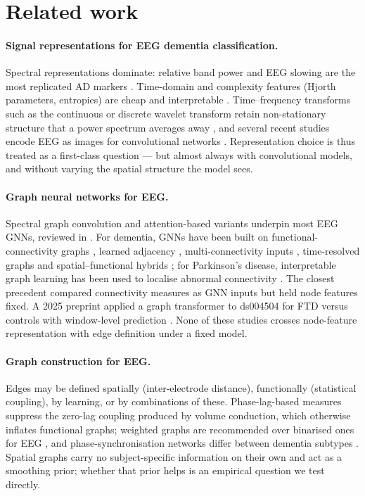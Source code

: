 \section{Related work}\label{sec:related}

\paragraph{Signal representations for EEG dementia classification.}
Spectral representations dominate: relative band power and EEG slowing are the most replicated AD
markers \cite{R3,F2,R15}. Time-domain and complexity features (Hjorth parameters, entropies) are
cheap and interpretable \cite{R15,R14}. Time--frequency transforms such as the continuous or
discrete wavelet transform retain non-stationary structure that a power spectrum averages away
\cite{R2,R16}, and several recent studies encode EEG as images for convolutional networks
\cite{R2,R10}. Representation choice is thus treated as a first-class question --- but almost
always with convolutional models, and without varying the spatial structure the model sees.

\paragraph{Graph neural networks for EEG.}
Spectral graph convolution \cite{F13} and attention-based variants \cite{gat} underpin most EEG
GNNs, reviewed in \cite{F5}. For dementia, GNNs have been built on functional-connectivity graphs
\cite{F3}, learned adjacency \cite{F4}, multi-connectivity inputs \cite{R12}, time-resolved graphs
\cite{R10} and spatial--functional hybrids \cite{R9}; for Parkinson's disease, interpretable graph
learning has been used to localise abnormal connectivity \cite{F7}. The closest precedent \cite{F3}
compared connectivity measures as GNN inputs but held node features fixed. A 2025 preprint applied
a graph transformer to ds004504 for FTD versus controls with window-level prediction \cite{B6}.
None of these studies crosses node-feature representation with edge definition under a fixed model.

\paragraph{Graph construction for EEG.}
Edges may be defined spatially (inter-electrode distance), functionally (statistical coupling), by
learning, or by combinations of these. Phase-lag-based measures \cite{F11,wpli} suppress the
zero-lag coupling produced by volume conduction, which otherwise inflates functional graphs; weighted
graphs are recommended over binarised ones for EEG \cite{F9}, and phase-synchronisation networks
differ between dementia subtypes \cite{R13,R16}. Spatial graphs carry no subject-specific
information on their own and act as a smoothing prior; whether that prior helps is an empirical
question we test directly.

